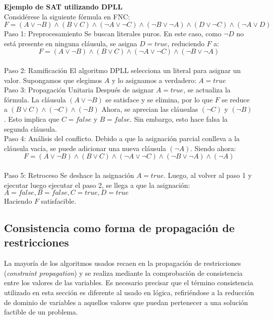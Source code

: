 \documentclass[12pt]{report}
\begin{document}
\textbf{Ejemplo de SAT utilizando DPLL}\\

Considérese la siguiente fórmula en FNC:
$F=(A\lor \neg B)\land(B\lor C)\land(\neg A\lor \neg C)\land(\neg B\lor \neg A)\land(D\lor \neg C)\land(\neg A\lor D)$\\

Paso 1: Preprocesamiento
Se buscan literales puros. En este caso, como $\neg D$ no está presente en ninguna cláusula, se asigna $D=true$, reduciendo $F$ a:
$$F=(A\lor \neg B)\land(B\lor C)\land(\neg A\lor \neg C)\land(\neg B\lor \neg A)$$\\

Paso 2: Ramificación
El algoritmo DPLL selecciona un literal para asignar un valor. Supongamos que elegimos $A$ y lo asignamos a verdadero:
$A=true$\\

Paso 3: Propagación Unitaria
Después de asignar $A=true$, se actualiza la fórmula. La cláusula $(A\lor \neg B)$ se satisface y se elimina, por lo que $F$ se reduce a $(B\lor C)\land(\neg C)\land(\neg B)$
Ahora, se aprecian las cláusulas $(\neg C)$ y $(\neg B)$. Esto implica que $C=false$ y $B=false$. Sin embargo, esto hace falsa la segunda cláusula.\\

Paso 4: Análisis del conflicto.
Debido a que la asignación parcial conlleva a la cláusula vacía, se puede adicionar una nueva cláusula $(\neg A)$. Siendo ahora:
$$F=(A\lor \neg B)\land(B\lor C)\land(\neg A\lor \neg C)\land(\neg B\lor \neg A)\land(\neg A)$$\\

Paso 5: Retroceso
Se deshace la asignación $A=true$. Luego, al volver al paso 1 y ejecutar luego ejecutar el paso 2, se llega a que la asignación:
$A=false, B=false,C=true, D=true$\\

Haciendo $F$ satisfacible.

\subsection{Consistencia como forma de propagación de restricciones}

La mayoría de los algoritmos usados recaen en la propagación de restricciones (\textit{constraint propagation}) y se realiza mediante la comprobación de consistencia entre los valores de las variables. Es necesario precisar que el término consistencia utilizado en esta sección es diferente al usado en lógica, refiriéndose a la reducción de dominio de variables a aquellos valores que puedan pertenecer a una solución factible de un problema.\\
\end{document}
